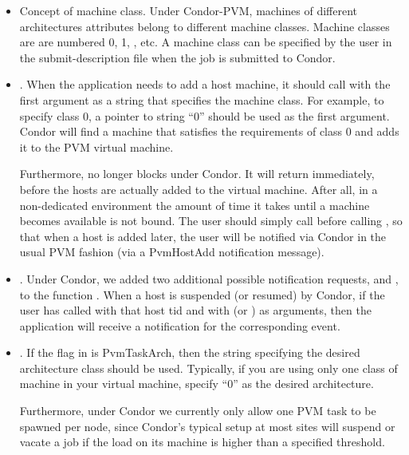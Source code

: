 \begin{itemize}

\item Concept of machine class.  Under Condor-PVM, machines of
  different architectures attributes belong to different machine classes.  Machine
  classes are are numbered 0, 1, \Dots, etc.  A machine class can be
  specified by the user in the submit-description file when the job
  is submitted to Condor.

\item {}.  When the application
  needs to add a host machine, it should call 
  with the first argument as a string that specifies the machine
  class.  For example, to specify class 0, a pointer to string ``0''
  should be used as the first argument.  Condor will find a machine
  that satisfies the requirements of class 0 and adds it to the PVM
  virtual machine.

  Furthermore,  no longer blocks under Condor.  It
  will return immediately, before the hosts are actually added to the virtual
  machine.  After all, in a non-dedicated environment the amount of time it takes until
  a machine becomes available is not bound. The user should simply call 
   before calling
  , so that when a host is added later, the user
  will be notified via Condor in the usual PVM 
  fashion (via a PvmHostAdd notification message).
    
\item {}.  Under Condor, we added two additional 
  possible notification requests,  and
  , to the function .  When a
  host is suspended (or resumed) by Condor, if the user has called
   with that host tid and with
   (or ) as arguments, then
  the application will receive a notification for the corresponding
  event.

\item {}.  If  the flag in  is 
  PvmTaskArch, then the string specifying the desired architecture
  class should be used.  Typically, if you are using only one class of
  machine in your virtual machine, specify ``0'' as the desired architecture.

  Furthermore, under Condor we currently only allow one
  PVM task to be spawned per node, since Condor's typical setup at most 
  sites will suspend or vacate
  a job if the load on its machine is higher than a specified
  threshold.

\end{itemize}

